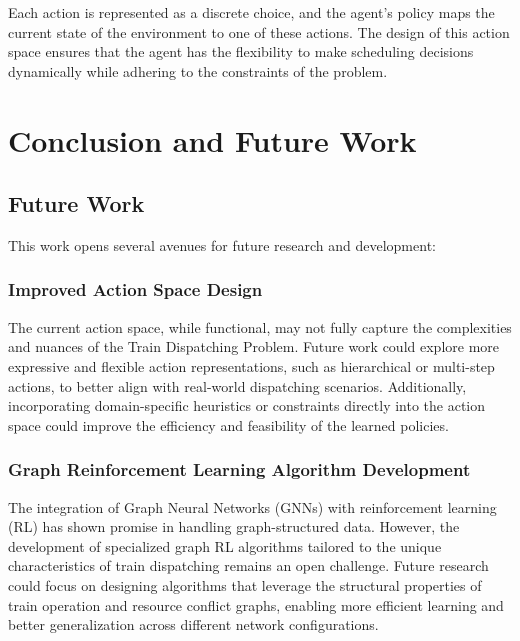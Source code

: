 \documentclass[runningheads]{llncs}
\begin{document}
Each action is represented as a discrete choice, and the agent's policy maps the current state of the environment to one of these actions. The design of this action space ensures that the agent has the flexibility to make scheduling decisions dynamically while adhering to the constraints of the problem.






\section{Conclusion and Future Work}
\label{sse:conclusion}

\subsection{Future Work}
\label{sss:future_work}
This work opens several avenues for future research and development:

\subsubsection{Improved Action Space Design}
The current action space, while functional, may not fully capture the complexities and nuances of the Train Dispatching Problem. 
Future work could explore more expressive and flexible action representations, such as hierarchical or multi-step actions, to better align with real-world dispatching scenarios. 
Additionally, incorporating domain-specific heuristics or constraints directly into the action space could improve the efficiency and feasibility of the learned policies.

\subsubsection{Graph Reinforcement Learning Algorithm Development}
The integration of Graph Neural Networks (GNNs) with reinforcement learning (RL) has shown promise in handling graph-structured data. 
However, the development of specialized graph RL algorithms tailored to the unique characteristics of train dispatching remains an open challenge. 
Future research could focus on designing algorithms that leverage the structural properties of train operation and resource conflict graphs, enabling more efficient learning and better generalization across different network configurations.
\end{document}
